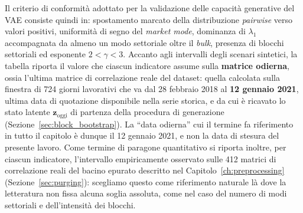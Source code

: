 Il criterio di conformità adottato per la validazione delle capacità generative del VAE consiste quindi in: spostamento marcato della distribuzione \emph{pairwise} verso valori positivi, uniformità di segno del \emph{market mode}, dominanza di $\lambda_1$ accompagnata da almeno un modo settoriale oltre il \emph{bulk}, presenza di blocchi settoriali ed esponente $2 < \gamma < 3$. Accanto agli intervalli degli scenari sintetici, la tabella riporta il valore che ciascun indicatore assume sulla \textbf{matrice odierna}, ossia l'ultima matrice di correlazione reale del dataset: quella calcolata sulla finestra di 724 giorni lavorativi che va dal 28 febbraio 2018 al \textbf{12 gennaio 2021}, ultima data di quotazione disponibile nella serie storica, e da cui è ricavato lo stato latente $\mathbf{z}_{\text{oggi}}$ di partenza della procedura di generazione (Sezione~\ref{sec:block_bootstrap}). La ``data odierna'' cui il termine fa riferimento in tutto il capitolo è dunque il 12 gennaio 2021, e non la data di stesura del presente lavoro. Come termine di paragone quantitativo si riporta inoltre, per ciascun indicatore, l'intervallo empiricamente osservato sulle 412 matrici di correlazione reali del bacino epurato descritto nel Capitolo~\ref{ch:preprocessing} (Sezione~\ref{sec:purging}): scegliamo questo come riferimento naturale là dove la letteratura non fissa alcuna soglia assoluta, come nel caso del numero di modi settoriali e dell'intensità dei blocchi.

